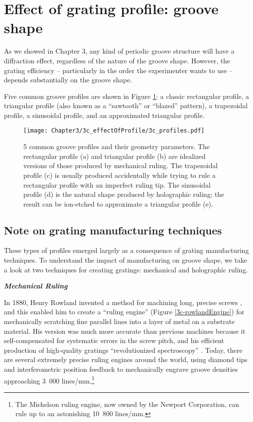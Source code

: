 \section{Effect of grating profile: groove shape}

As we showed in Chapter 3, any kind of periodic groove structure will have a diffraction effect, regardless of the nature of the groove shape.  However, the grating efficiency -- particularly in the order the experimenter wants to use -- depends substantially on the groove shape.  

Five common groove profiles are shown in Figure \ref{3c-profile}: a classic rectangular profile, a triangular profile (also known as a ``sawtooth'' or ``blazed'' pattern), a trapezoidal profile, a sinusoidal profile, and an approximated triangular profile.

\begin{figure}[htbp] %
   \centering
   \texttt{[image: Chapter3/3c\_effectOfProfile/3c\_profiles.pdf]}
   \caption[5 common groove profiles and their geometry parameters.]{5 common groove profiles and their geometry parameters.  The rectangular profile (a) and triangular profile (b) are idealized versions of those produced by mechanical ruling.  The trapezoidal profile (c) is usually produced accidentally while trying to rule a rectangular profile with an imperfect ruling tip.  The sinusoidal profile (d) is the natural shape produced by holographic ruling; the result can be ion-etched to approximate a triangular profile (e).}
   \label{3c-profile}
\end{figure}

\subsection{Note on grating manufacturing techniques}
\label{gratingManufacturing}
These types of profiles emerged largely as a consequence of grating manufacturing techniques.  To understand the impact of manufacturing on groove shape, we take a look at two techniques for creating gratings: mechanical and holographic ruling.

\noindent \textbf{\emph{Mechanical Ruling}}

\noindent In 1880, Henry Rowland invented a method for machining long, precise screws \cite{Row02}, and this enabled him to create a ``ruling engine'' (Figure \ref{3c-rowlandEngine}) for mechanically scratching fine parallel lines into a layer of metal on a substrate material.  His version was much more accurate than previous machines because it self-compensated for systematic errors in the screw pitch, and his efficient production of high-quality gratings ``revolutionized spectroscopy'' \cite{Wea76}.  Today, there are several extremely precise ruling engines around the world, using diamond tips and interferometric position feedback to mechanically engrave groove densities approaching 3~000 lines/mm.\footnote{The Michelson ruling engine, now owned by the Newport Corporation, can rule up to an astonishing 10~800 lines/mm.}

